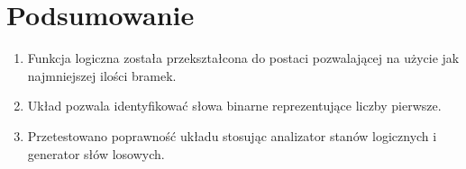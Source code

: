 \documentclass[12pt,a4paper,openright]{mwrep}
\begin{document}
\section{Podsumowanie}
\begin{enumerate}
    \item Funkcja logiczna została przekształcona do postaci pozwalającej na użycie jak najmniejszej ilości bramek.
    \item Układ pozwala identyfikować słowa binarne reprezentujące liczby pierwsze.
    \item Przetestowano poprawność układu stosując analizator stanów logicznych i generator słów losowych.
\end{enumerate}
\end{document}
